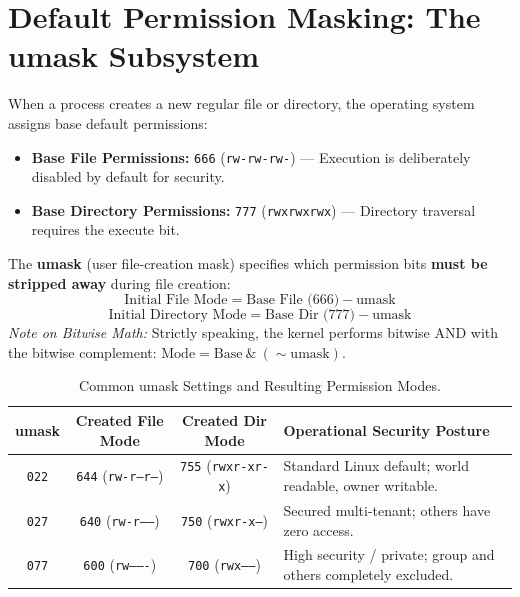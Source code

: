 \section{Default Permission Masking: The umask Subsystem}
When a process creates a new regular file or directory, the operating system assigns base default permissions:
\begin{itemize}[leftmargin=1.5em]
    \item \textbf{Base File Permissions:} \texttt{666} (\texttt{rw-rw-rw-}) --- Execution is deliberately disabled by default for security.
    \item \textbf{Base Directory Permissions:} \texttt{777} (\texttt{rwxrwxrwx}) --- Directory traversal requires the execute bit.
\end{itemize}

\begin{definition}
The \textbf{umask} (user file-creation mask) specifies which permission bits \textbf{must be stripped away} during file creation:
\begin{equation}
\text{Initial File Mode} = \text{Base File (666)} - \text{umask}
\end{equation}
\begin{equation}
\text{Initial Directory Mode} = \text{Base Dir (777)} - \text{umask}
\end{equation}
\textit{Note on Bitwise Math:} Strictly speaking, the kernel performs bitwise AND with the bitwise complement: $\text{Mode} = \text{Base} \ \& \ (\sim \text{umask})$.
\end{definition}

\begin{table}[htbp]
\centering
\small
\begin{tabularx}{\linewidth}{c c c X}
\toprule
\textbf{umask} & \textbf{Created File Mode} & \textbf{Created Dir Mode} & \textbf{Operational Security Posture} \\
\midrule
\texttt{022} & \texttt{644} (\texttt{rw-r--r--}) & \texttt{755} (\texttt{rwxr-xr-x}) & Standard Linux default; world readable, owner writable. \\
\texttt{027} & \texttt{640} (\texttt{rw-r-----}) & \texttt{750} (\texttt{rwxr-x---}) & Secured multi-tenant; others have zero access. \\
\texttt{077} & \texttt{600} (\texttt{rw-------}) & \texttt{700} (\texttt{rwx------}) & High security / private; group and others completely excluded. \\
\bottomrule
\end{tabularx}
\caption{Common umask Settings and Resulting Permission Modes.}
\label{tab:umask}
\end{table}

